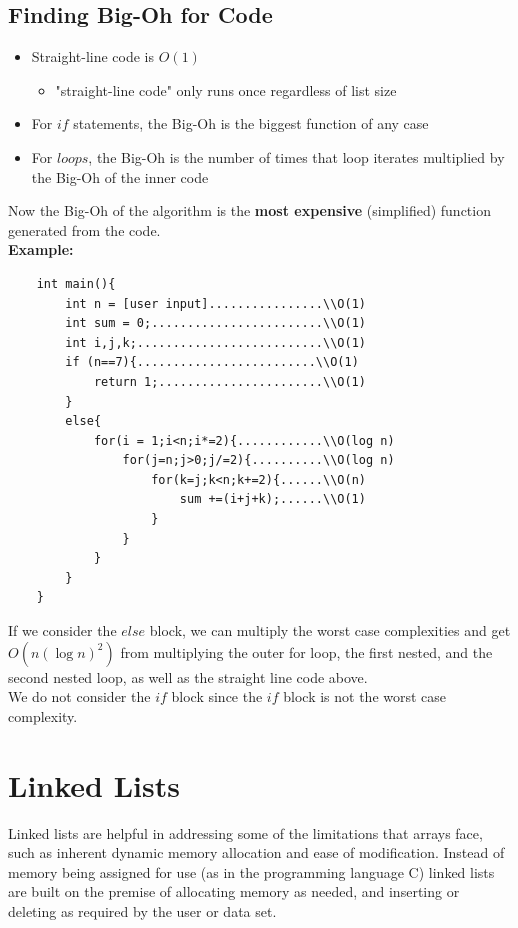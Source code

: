 \documentclass[hidelinks,11pt]{article}
\begin{document}
\subsection{Finding Big-Oh for Code}
\begin{itemize}
    \item Straight-line code is $O(1)$ 
    \begin{itemize}
        \item "straight-line code" only runs once regardless of list size
    \end{itemize}
    \item For $if$ statements, the Big-Oh is the biggest function of any case
    \item For $loops$, the Big-Oh is the number of times that loop iterates multiplied by the Big-Oh of the inner code
\end{itemize}
Now the Big-Oh of the algorithm is the \textbf{most expensive} (simplified) function generated from the code.\\[.5\baselineskip]
\textbf{Example:}
\begin{lstlisting}
    int main(){
        int n = [user input]................\\O(1)
        int sum = 0;........................\\O(1)
        int i,j,k;..........................\\O(1)
        if (n==7){.........................\\O(1)
            return 1;.......................\\O(1)
        }
        else{ 
            for(i = 1;i<n;i*=2){............\\O(log n)
                for(j=n;j>0;j/=2){..........\\O(log n)
                    for(k=j;k<n;k+=2){......\\O(n)
                        sum +=(i+j+k);......\\O(1)
                    }
                }
            }
        }
    }
\end{lstlisting}
If we consider the $else$ block, we can multiply the worst case complexities and get $O(n(\log n)^2)$ from multiplying the outer for loop, the first nested, and the second nested loop, as well as the straight line code above.\\[0.5\baselineskip]
We do not consider the $if$ block since the $if$ block is not the worst case complexity.
\section{Linked Lists}
Linked lists are helpful in addressing some of the limitations that arrays face, such as inherent dynamic memory allocation and ease of modification. Instead of memory being assigned for use (as in the programming language C) linked lists are built on the premise of allocating memory as needed, and inserting or deleting as required by the user or data set.
\end{document}
